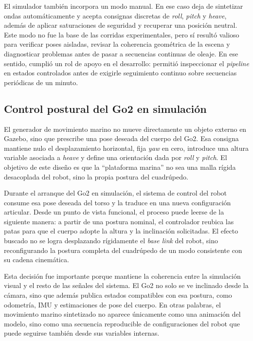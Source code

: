 \documentclass[12pt,a4paper]{report}
\begin{document}
El simulador también incorpora un modo manual. En ese caso deja de sintetizar
ondas automáticamente y acepta consignas discretas de \emph{roll}, \emph{pitch} y \emph{heave},
además de aplicar saturaciones de seguridad y recuperar una posición neutral.
Este modo no fue la base de las corridas experimentales, pero sí resultó valioso
para verificar poses aisladas, revisar la coherencia geométrica de la escena y
diagnosticar problemas antes de pasar a secuencias continuas de oleaje. En ese
sentido, cumplió un rol de apoyo en el desarrollo: permitió inspeccionar el
\textit{pipeline} en estados controlados antes de exigirle seguimiento continuo sobre
secuencias periódicas de un minuto.

\subsection{Control postural del Go2 en simulación}

El generador de movimiento marino no mueve directamente un objeto externo en
Gazebo, sino que prescribe una pose deseada del cuerpo del Go2. Esa consigna
mantiene nulo el desplazamiento horizontal, fija \emph{yaw} en cero, introduce una
altura variable asociada a \emph{heave} y define una orientación dada por \emph{roll} y \emph{pitch}.
El objetivo de este diseño es que la ``plataforma marina'' no sea una malla
rígida desacoplada del robot, sino la propia postura del cuadrúpedo.

Durante el arranque del Go2 en simulación, el sistema de control del robot consume
esa pose deseada del torso y la traduce en una nueva configuración articular.
Desde un punto de vista funcional, el proceso puede leerse de la siguiente
manera: a partir de una postura nominal, el controlador reubica las patas para
que el cuerpo adopte la altura y la inclinación solicitadas. El efecto buscado
no se logra desplazando rígidamente el \textit{base link} del robot, sino
reconfigurando la postura completa del cuadrúpedo de un modo consistente con su
cadena cinemática.

Esta decisión fue importante porque mantiene la coherencia entre la simulación
visual y el resto de las señales del sistema. El Go2 no solo se ve inclinado
desde la cámara, sino que además publica estados compatibles con esa postura,
como odometría, IMU y estimaciones de pose del cuerpo. En otras palabras, el
movimiento marino sintetizado no aparece únicamente como una animación del
modelo, sino como una secuencia reproducible de configuraciones del robot que
puede seguirse también desde sus variables internas.
\end{document}
